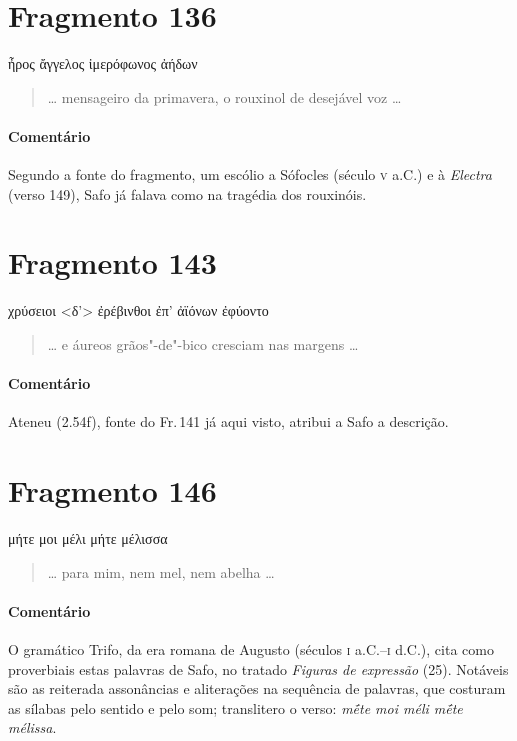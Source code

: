 \section{Fragmento 136}

\begin{gkverse}
ἦρος ἄγγελος ἰμερόφωνος ἀήδων
\end{gkverse}

\begin{verse}
\ldots{} mensageiro da primavera, o rouxinol de desejável voz \ldots{}
\end{verse}

{\paragraph{Comentário} Segundo a fonte do fragmento, um escólio a Sófocles (século \textsc{v} a.C.) e à \textit{Electra} (verso 149), Safo já falava como na tragédia dos
rouxinóis.}

\section{Fragmento 143}

\begin{gkverse}
χρύσειοι <δ’> ἐρέβινθοι ἐπ’ ἀϊόνων ἐφύοντο
\end{gkverse}

\begin{verse}
\ldots{} e áureos grãos"-de"-bico cresciam nas margens \ldots{}
\end{verse}

{\paragraph{Comentário} Ateneu (2.54f), fonte do Fr.\,141 já aqui visto, atribui a Safo a descrição.}


\pagebreak
\section{Fragmento 146}

\begin{gkverse}
μήτε μοι μέλι μήτε μέλισσα
\end{gkverse}

\begin{verse}
\ldots{} para mim, nem mel, nem abelha \ldots{}
\end{verse}

{\paragraph{Comentário} O gramático Trifo, da era romana de Augusto (séculos \textsc{i} a.C.--\textsc{i} d.C.), 
cita como proverbiais estas palavras de Safo, no tratado \textit{Figuras de expressão} (25).
Notáveis são as reiterada assonâncias e aliterações na sequência de palavras, que costuram as sílabas pelo sentido e pelo som; translitero o verso: \textit{mḗte moi méli mḗte mélissa}.}


